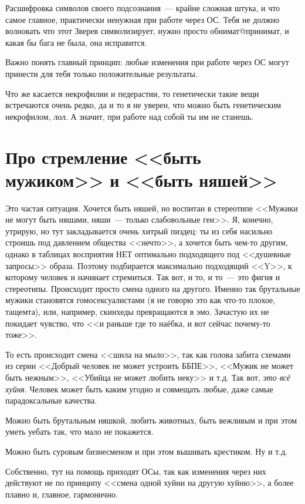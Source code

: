\documentclass[a5paper,12pt,twoside]{memoir}
\begin{document}
\makeatletter
Расшифровка символов своего подсознания~--- край\-не сложная штука, и что самое главное, практически ненужная при работе через ОС. Тебя не должно волновать что этот Зверев символизирует, нужно просто обнимат@принимат, и какая бы бага не была, она исправится.
\makeatother

Важно понять главный принцип: любые изменения при работе через ОС могут принести для тебя только положительные результаты.

Что же касается некрофилии и педерастии, то генетически такие вещи встречаются очень редко, да и то я не уверен, что можно быть генетическим некрофилом, лол. А значит, при работе над собой ты им не станешь. 




\section{Про стремление <<быть мужиком>> и <<быть няшей>>} 
Это частая ситуация. Хочется быть няшей, но воспитан в стереотипе <<Мужики не могут быть няшами, няши~--- только слабовольные геи>>. Я, конечно, утрирую, но тут закладывается очень хитрый пиздец: ты из себя насильно строишь под давлением общества <<нечто>>, а хочется быть чем-то другим, однако в таблицах восприятия НЕТ оптимально подходящего под <<душевные запросы>> образа. Поэтому подбирается максимально подходящий <<Y>>, к которому человек и начинает стремиться. Так вот, и то, и то~--- это фигня и стереотипы. Происходит просто смена одного на другого. Именно так брутальные мужики становятся гомосексуалистами (я не говорю это как что-то плохое, тащемта), или, например, скинхеды превращаются в эмо. Зачастую их не покидает чувство, что <<и раньше где то наёбка, и вот сейчас почему-то тоже>>. 

То есть происходит смена <<шила на мыло>>, так как голова забита схемами из серии <<Добрый человек не может устроить ББПЕ>>, <<Мужик не может быть нежным>>, <<Убийца не может любить неку>> и т.д. Так вот, \textit{это всё хуйня}. Человек может быть каким угодно и совмещать любые, даже самые парадоксальные качества.
 
Можно быть брутальным няшкой, любить животных, быть вежливым и при этом уметь уебать так, что мало не покажется. 

Можно быть суровым бизнесменом и при этом вышивать крестиком. Ну и т.д. 

Собственно, тут на помощь приходят ОСы, так как изменения через них действуют не по принципу <<смена одной хуйни на другую хуйню>>, а более плавно и, главное, гармонично. 
\end{document}
